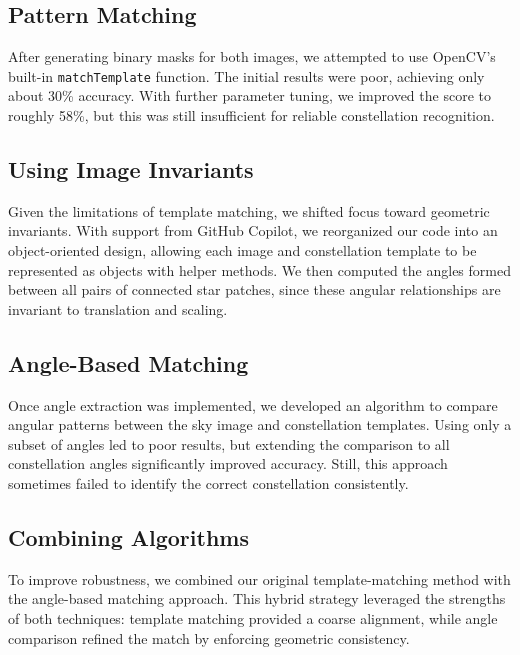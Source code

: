 \documentclass[a4paper,11pt]{article}
\begin{document}
\subsection{Pattern Matching}
After generating binary masks for both images, we attempted to use OpenCV’s built-in \texttt{matchTemplate} function. The initial results were poor, achieving only about 30\% accuracy. With further parameter tuning, we improved the score to roughly 58\%, but this was still insufficient for reliable constellation recognition.

\subsection{Using Image Invariants}
Given the limitations of template matching, we shifted focus toward geometric invariants. With support from GitHub Copilot, we reorganized our code into an object-oriented design, allowing each image and constellation template to be represented as objects with helper methods. We then computed the angles formed between all pairs of connected star patches, since these angular relationships are invariant to translation and scaling.

\subsection{Angle-Based Matching}
Once angle extraction was implemented, we developed an algorithm to compare angular patterns between the sky image and constellation templates. Using only a subset of angles led to poor results, but extending the comparison to all constellation angles significantly improved accuracy. Still, this approach sometimes failed to identify the correct constellation consistently.

\subsection{Combining Algorithms}
To improve robustness, we combined our original template-matching method with the angle-based matching approach. This hybrid strategy leveraged the strengths of both techniques: template matching provided a coarse alignment, while angle comparison refined the match by enforcing geometric consistency.


\end{document}
